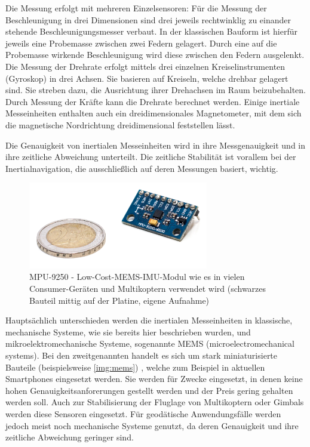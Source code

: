 \documentclass[a4paper,12pt,bibliography=totoc, listof=totoc,titlepage,pointlessnumbers]{scrreprt}
\begin{document}
Die Messung erfolgt mit mehreren Einzelsensoren: Für die Messung der Beschleunigung in drei Dimensionen sind drei jeweils rechtwinklig zu einander stehende Beschleunigungsmesser verbaut. In der klassischen Bauform ist hierfür jeweils eine Probemasse zwischen zwei Federn gelagert. Durch eine auf die Probemasse wirkende Beschleunigung wird diese zwischen den Federn ausgelenkt. Die Messung der Drehrate erfolgt mittels drei einzelnen Kreiselinstrumenten (Gyroskop) in drei Achsen. Sie basieren auf Kreiseln, welche drehbar gelagert sind. Sie streben dazu, die Ausrichtung ihrer Drehachsen im Raum beizubehalten. Durch Messung der Kräfte kann die Drehrate berechnet werden. Einige inertiale Messeinheiten enthalten auch ein dreidimensionales Magnetometer, mit dem sich die magnetische Nordrichtung dreidimensional feststellen lässt.

Die Genauigkeit von inertialen Messeinheiten wird in ihre Messgenauigkeit und in ihre zeitliche Abweichung unterteilt. Die zeitliche Stabilität ist vorallem bei der Inertialnavigation, die ausschließlich auf deren Messungen basiert, wichtig.

\begin{figure}
 \centering
 \includegraphics[width=0.7\textwidth]{./img/mems.jpg}
 \caption{MPU-9250 - Low-Cost-MEMS-IMU-Modul wie es in vielen Consumer-Geräten und Multikoptern verwendet wird (schwarzes Bauteil mittig auf der Platine, eigene Aufnahme)}
 \label{img:mems}
\end{figure}

Hauptsächlich unterschieden werden die inertialen Messeinheiten in klassische, mechanische Systeme, wie sie bereits hier beschrieben wurden, und mikroelektromechanische Systeme, sogenannte MEMS (microelectromechanical systems). Bei den zweitgenannten handelt es sich um stark miniaturisierte Bauteile (beispielsweise \autoref{img:mems}) , welche zum Beispiel in aktuellen Smartphones eingesetzt werden. Sie werden für Zwecke eingesetzt, in denen keine hohen Genauigkeitsanforerungen gestellt werden und der Preis gering gehalten werden soll. Auch zur Stabilisierung der Fluglage von Multikoptern oder Gimbals werden diese Sensoren eingesetzt. Für geodätische Anwendungsfälle werden jedoch meist noch mechanische Systeme genutzt, da deren Genauigkeit und ihre zeitliche Abweichung geringer sind.
\end{document}
